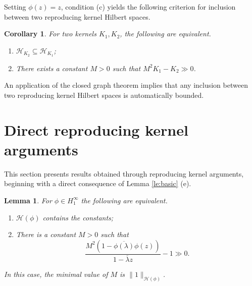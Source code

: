\documentclass[11pt]{amsart}
\def\C{{\mathbb{C}}}
\def\D{\mathbb{D}}
\def\HH{{\mathcal H}}
\renewcommand{\subset}{\subseteq}
\numberwithin{equation}{section}
\theoremstyle{plain}
\newtheorem{corollary}[equation]{Corollary}
\newtheorem{lemma}[equation]{Lemma}
\theoremstyle{definition}
\begin{document}
Setting $\phi(z) = z$, condition (c) yields the following criterion for inclusion between two reproducing kernel Hilbert spaces. 

\begin{corollary}\label{co:inclusion between RKHS}
	For two kernels $ K_1, K_2 $, the following are equivalent. 
    \begin{enumerate}
        \item $\mathcal{H}_{K_2}\subset \mathcal{H}_{K_1}$;
        \item There exists a constant  $M>0$ such that $M^2K_1-K_2 \gg0$.
    \end{enumerate}
\end{corollary}

An application of the closed graph theorem implies  that any inclusion between two reproducing kernel Hilbert spaces is automatically bounded.
 
 \section{Direct reproducing kernel arguments}\label{se:simple results}
 
This section presents results obtained through reproducing kernel arguments, beginning with a direct consequence of Lemma \ref{le:basic} (e).
 

\begin{lemma}\label{le:1 in H9phi} For $ \phi\in H^\infty_1 $ the following are equivalent. 
\begin{enumerate}
    \item $ \HH(\phi) $ contains the constants;
    \item There is a constant $ M > 0 $ such that 
	\begin{equation}\label{eq:1 in Hphi}
	 \frac{M^2(1-\overline{\phi(\lambda)}\phi(z))}{1- \overline{\lambda} z}-1\gg0.
	\end{equation}
\end{enumerate}
	In this case, the minimal value of $ M $ is $ \| 1 \|_{\HH(\phi)} $.
\end{lemma}

\end{document}
